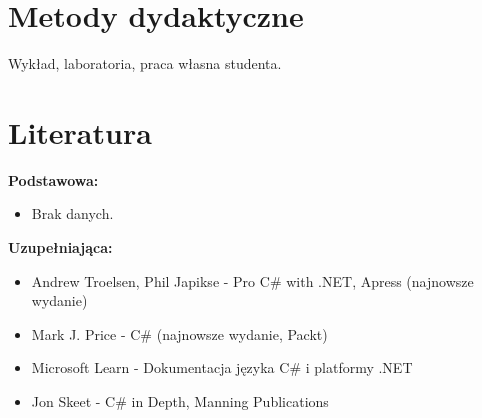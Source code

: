 \documentclass[12pt, a4paper]{article}
\begin{document}
\section{Metody dydaktyczne}

Wykład, laboratoria, praca własna studenta.

\section{Literatura}

\textbf{Podstawowa:}
\begin{itemize}
  \item Brak danych.
\end{itemize}

\textbf{Uzupełniająca:}
\begin{itemize}
  \item Andrew Troelsen, Phil Japikse - Pro C\# with .NET, Apress (najnowsze wydanie)
  \item Mark J. Price - C\# (najnowsze wydanie, Packt)
  \item Microsoft Learn - Dokumentacja języka C\# i platformy .NET
  \item Jon Skeet - C\# in Depth, Manning Publications
\end{itemize}
\end{document}
